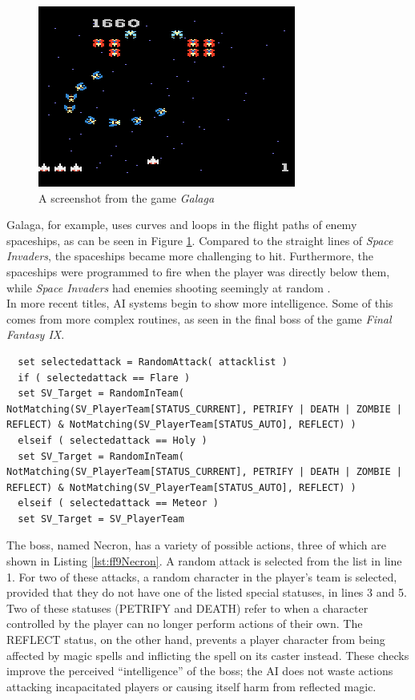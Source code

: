\begin{figure}[H]
  \centering
  \includegraphics{figures/ExampleGalaga.png}
  \caption{A screenshot from the game \textit{Galaga}}
  \label{fig:Galaga}
\end{figure}
Galaga, for example, uses curves and loops in the flight paths of enemy spaceships, as can be seen in Figure \ref{fig:Galaga}. Compared to the straight lines of \textit{Space Invaders}, the spaceships became more challenging to hit. Furthermore, the spaceships were programmed to fire when the player was directly below them, while \textit {Space Invaders} had enemies shooting seemingly at random \cite{schw04}.\\

In more recent titles, AI systems begin to show more intelligence. Some of this comes from more complex routines, as seen in the final boss of the game \textit{Final Fantasy IX}.

\begin{lstlisting}
  set selectedattack = RandomAttack( attacklist )
  if ( selectedattack == Flare )
  set SV_Target = RandomInTeam( NotMatching(SV_PlayerTeam[STATUS_CURRENT], PETRIFY | DEATH | ZOMBIE | REFLECT) & NotMatching(SV_PlayerTeam[STATUS_AUTO], REFLECT) )
  elseif ( selectedattack == Holy )
  set SV_Target = RandomInTeam( NotMatching(SV_PlayerTeam[STATUS_CURRENT], PETRIFY | DEATH | ZOMBIE | REFLECT) & NotMatching(SV_PlayerTeam[STATUS_AUTO], REFLECT) )
  elseif ( selectedattack == Meteor )
  set SV_Target = SV_PlayerTeam
\end{lstlisting}

The boss, named Necron, has a variety of possible actions, three of which are shown in Listing \ref{lst:ff9Necron}. A random attack is selected from the list in line 1. For two of these attacks, a random character in the player's team is selected, provided that they do not have one of the listed special statuses, in lines 3 and 5. Two of these statuses (PETRIFY and DEATH) refer to when a character controlled by the player can no longer perform actions of their own. The REFLECT status, on the other hand, prevents a player character from being affected by magic spells and inflicting the spell on its caster instead. These checks improve the perceived ``intelligence'' of the boss; the AI does not waste actions attacking incapacitated players or causing itself harm from reflected magic.\\


